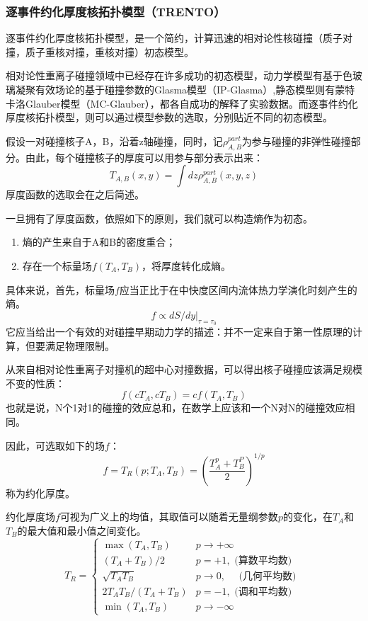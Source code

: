 \documentclass[aps,pre,12pt,preprint,onecolumn,showpacs,showkeys]{revtex4-1}
\begin{document}
\subsubsection{逐事件约化厚度核拓扑模型（TRENTO）}
逐事件约化厚度核拓扑模型，是一个简约，计算迅速的相对论性核碰撞（质子对撞，质子重核对撞，重核对撞）初态模型。
\par
相对论性重离子碰撞领域中已经存在许多成功的初态模型，动力学模型有基于色玻璃凝聚有效场论的基于碰撞参数的Glasma模型（IP-Glasma）,静态模型则有蒙特卡洛Glauber模型（MC-Glauber），都各自成功的解释了实验数据。而逐事件约化厚度核拓扑模型，则可以通过模型参数的选取，分别贴近不同的初态模型。
\par
假设一对碰撞核子A，B，沿着z轴碰撞，同时，记$\rho_{A,B}^{part}$为参与碰撞的非弹性碰撞部分。由此，每个碰撞核子的厚度可以用参与部分表示出来：
\begin{equation}
    T_{A,B}(x,y)=\int dz \rho_{A,B}^{part}(x,y,z)
\end{equation}
厚度函数的选取会在之后简述。\par
一旦拥有了厚度函数，依照如下的原则，我们就可以构造熵作为初态。
\begin{enumerate}
    \item 熵的产生来自于A和B的密度重合；
    \item 存在一个标量场$f(T_A,T_B)$，将厚度转化成熵。
\end{enumerate}
具体来说，首先，标量场$f$应当正比于在中快度区间内流体热力学演化时刻产生的熵。
\begin{equation}
    f\propto dS/dy|_{\tau=\tau_0}
\end{equation}
它应当给出一个有效的对碰撞早期动力学的描述：并不一定来自于第一性原理的计算，但要满足物理限制。
\par
从来自相对论性重离子对撞机的超中心对撞数据，可以得出核子碰撞应该满足规模不变的性质：
\begin{equation}
    f(cT_A,cT_B)=cf(T_A,T_B)
\end{equation}
也就是说，N个1对1的碰撞的效应总和，在数学上应该和一个N对N的碰撞效应相同。\par
因此，可选取如下的场$f$：
\begin{equation}
    f=T_R(p;T_A,T_B)=(\frac{T^p_A+T^P_B}{2})^{1/p}
\end{equation}
称为约化厚度。\par
约化厚度场$f$可视为广义上的均值，其取值可以随着无量纲参数$p$的变化，在$T_A$和$T_B$的最大值和最小值之间变化。
\begin{equation}
T_{R}=\left\{\begin{array}{ll}{\max \left(T_{A}, T_{B}\right)} & {p \rightarrow+\infty} \\ 
{\left(T_{A}+T_{B}\right) / 2} & {p=+1, \text { (算数平均数) }} \\ 
{\sqrt{T_{A} T_{B}}} & {p\to0, \quad \text { (几何平均数) }} \\ 
{2 T_{A} T_{B} /\left(T_{A}+T_{B}\right)} & {p=-1, \text { (调和平均数) }} \\ 
{\min \left(T_{A}, T_{B}\right)} & {p \rightarrow-\infty}\end{array}\right.
\end{equation}
\end{document}
